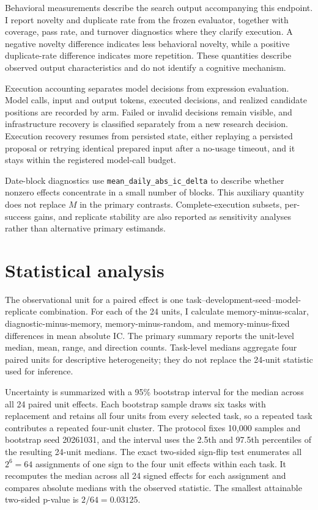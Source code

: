 Behavioral measurements describe the search output accompanying this endpoint. I report novelty and duplicate rate from the frozen evaluator, together with coverage, pass rate, and turnover diagnostics where they clarify execution. A negative novelty difference indicates less behavioral novelty, while a positive duplicate-rate difference indicates more repetition. These quantities describe observed output characteristics and do not identify a cognitive mechanism.

Execution accounting separates model decisions from expression evaluation. Model calls, input and output tokens, executed decisions, and realized candidate positions are recorded by arm. Failed or invalid decisions remain visible, and infrastructure recovery is classified separately from a new research decision. Execution recovery resumes from persisted state, either replaying a persisted proposal or retrying identical prepared input after a no-usage timeout, and it stays within the registered model-call budget.

Date-block diagnostics use \texttt{mean\_daily\_abs\_ic\_delta} to describe whether nonzero effects concentrate in a small number of blocks. This auxiliary quantity does not replace $M$ in the primary contrasts. Complete-execution subsets, per-success gains, and replicate stability are also reported as sensitivity analyses rather than alternative primary estimands.

\section{Statistical analysis}
\label{sec:analysis}

The observational unit for a paired effect is one task--development-seed--model-replicate combination. For each of the 24 units, I calculate memory-minus-scalar, diagnostic-minus-memory, memory-minus-random, and memory-minus-fixed differences in mean absolute IC. The primary summary reports the unit-level median, mean, range, and direction counts. Task-level medians aggregate four paired units for descriptive heterogeneity; they do not replace the 24-unit statistic used for inference.

Uncertainty is summarized with a 95\% bootstrap interval for the median across all 24 paired unit effects. Each bootstrap sample draws six tasks with replacement and retains all four units from every selected task, so a repeated task contributes a repeated four-unit cluster. The protocol fixes 10{,}000 samples and bootstrap seed 20261031, and the interval uses the 2.5th and 97.5th percentiles of the resulting 24-unit medians. The exact two-sided sign-flip test enumerates all $2^6=64$ assignments of one sign to the four unit effects within each task. It recomputes the median across all 24 signed effects for each assignment and compares absolute medians with the observed statistic. The smallest attainable two-sided p-value is $2/64=0.03125$.

